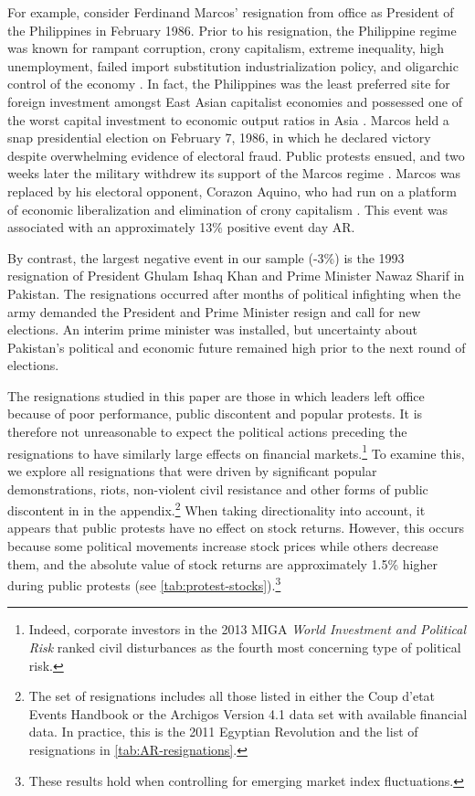 \documentclass[12pt,final,fleqn]{article}
\theoremstyle{plain}
\begin{document}
For example, consider Ferdinand Marcos' resignation from office as President of the Philippines in February 1986. Prior to his resignation, the Philippine regime was known for rampant corruption, crony capitalism, extreme inequality, high unemployment, failed import substitution industrialization policy, and oligarchic control of the economy \citep{overholt1986rise, traywick2014}. In fact, the Philippines was the least preferred site for foreign investment amongst East Asian capitalist economies and possessed one of the worst capital investment to economic output ratios in Asia \citep{overholt1986rise}. Marcos held a snap presidential election on February 7, 1986, in which he declared victory despite overwhelming evidence of electoral fraud. Public protests ensued, and two weeks later the military withdrew its support of the Marcos regime \citep{lee2009armed}. Marcos was replaced by his electoral opponent, Corazon Aquino, who had run on a platform of economic liberalization and elimination of crony capitalism \citep{villegas1987philippines}. This event was associated with an approximately 13\% positive event day AR.

By contrast, the largest negative event in our sample (-3\%) is the 1993 resignation of President Ghulam Ishaq Khan and Prime Minister Nawaz Sharif in Pakistan. The resignations occurred after months of political infighting when the army demanded the President and Prime Minister resign and call for new elections. An interim prime minister was installed, but uncertainty about Pakistan's political and economic future remained high prior to the next round of elections.

The resignations studied in this paper are those in which leaders left office because of poor performance, public discontent and popular protests. It is therefore not unreasonable to expect the political actions preceding the resignations to have similarly large effects on financial markets.\footnote{Indeed, corporate investors in the 2013 MIGA \textit{World Investment and Political Risk} ranked civil disturbances as the fourth most concerning type of political risk.} To examine this, we explore all resignations that were driven by significant popular demonstrations, riots, non-violent civil resistance and other forms of public discontent in  in the appendix.\footnote{The set of resignations includes all those listed in either the Coup d'etat Events Handbook or the Archigos Version 4.1 data set with available financial data. In practice, this is the 2011 Egyptian Revolution and the list of resignations in \autoref{tab:AR-resignations}.} When taking directionality into account, it appears that public protests have no effect on stock returns. However, this occurs because some political movements increase stock prices while others decrease them, and the absolute value of stock returns are approximately 1.5\% higher during public protests (see \autoref{tab:protest-stocks}).\footnote{These results hold when controlling for emerging market index fluctuations.}
\end{document}

